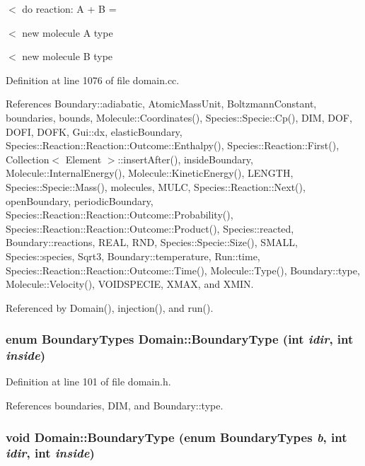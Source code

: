 $<$ do reaction: A + B =

$<$ new molecule A type

$<$ new molecule B type 

Definition at line 1076 of file domain.cc.

References Boundary::adiabatic, AtomicMassUnit, BoltzmannConstant, boundaries, bounds, Molecule::Coordinates(), Species::Specie::Cp(), DIM, DOF, DOFI, DOFK, Gui::dx, elasticBoundary, Species::Reaction::Reaction::Outcome::Enthalpy(), Species::Reaction::First(), Collection$<$ Element $>$::insertAfter(), insideBoundary, Molecule::InternalEnergy(), Molecule::KineticEnergy(), LENGTH, Species::Specie::Mass(), molecules, MULC, Species::Reaction::Next(), openBoundary, periodicBoundary, Species::Reaction::Reaction::Outcome::Probability(), Species::Reaction::Reaction::Outcome::Product(), Species::reacted, Boundary::reactions, REAL, RND, Species::Specie::Size(), SMALL, Species::species, Sqrt3, Boundary::temperature, Run::time, Species::Reaction::Reaction::Outcome::Time(), Molecule::Type(), Boundary::type, Molecule::Velocity(), VOIDSPECIE, XMAX, and XMIN.

Referenced by Domain(), injection(), and run().\hypertarget{classDomain_040e0b00633af32e4bf293c87932003b}{
\subsubsection[{BoundaryType}]{\setlength{\rightskip}{0pt plus 5cm}enum {\bf BoundaryTypes} Domain::BoundaryType (int {\em idir}, \/  int {\em inside})}}
\label{classDomain_040e0b00633af32e4bf293c87932003b}




Definition at line 101 of file domain.h.

References boundaries, DIM, and Boundary::type.\hypertarget{classDomain_aa7e3ba77943b470095a43fffff51ea7}{
\subsubsection[{BoundaryType}]{\setlength{\rightskip}{0pt plus 5cm}void Domain::BoundaryType (enum {\bf BoundaryTypes} {\em b}, \/  int {\em idir}, \/  int {\em inside})}}
\label{classDomain_aa7e3ba77943b470095a43fffff51ea7}




